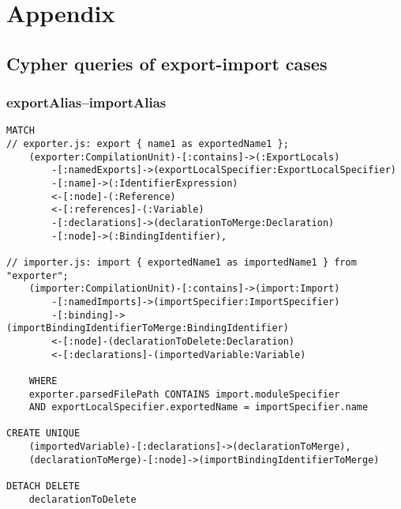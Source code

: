 \appendix
\chapter*{Appendix}
{}
\renewcommand{\thesection}{\Alph{section}}

\section{Cypher queries of export-import cases}

\subsection{exportAlias–importAlias}
\begin{lstlisting}[language=Cypher]
MATCH
// exporter.js: export { name1 as exportedName1 };
    (exporter:CompilationUnit)-[:contains]->(:ExportLocals)
        -[:namedExports]->(exportLocalSpecifier:ExportLocalSpecifier)
        -[:name]->(:IdentifierExpression)
        <-[:node]-(:Reference)
        <-[:references]-(:Variable)
        -[:declarations]->(declarationToMerge:Declaration)
        -[:node]->(:BindingIdentifier),

// importer.js: import { exportedName1 as importedName1 } from "exporter";
    (importer:CompilationUnit)-[:contains]->(import:Import)
        -[:namedImports]->(importSpecifier:ImportSpecifier)
        -[:binding]->(importBindingIdentifierToMerge:BindingIdentifier)
        <-[:node]-(declarationToDelete:Declaration)
        <-[:declarations]-(importedVariable:Variable)

    WHERE
    exporter.parsedFilePath CONTAINS import.moduleSpecifier
    AND exportLocalSpecifier.exportedName = importSpecifier.name

CREATE UNIQUE
    (importedVariable)-[:declarations]->(declarationToMerge),
    (declarationToMerge)-[:node]->(importBindingIdentifierToMerge)

DETACH DELETE
    declarationToDelete
\end{lstlisting}

\newpage
